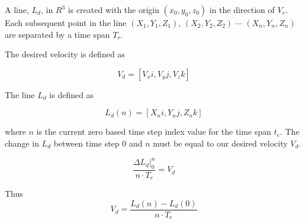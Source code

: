 A line, $L_d$, in $R^3$ is created with the origin $(x_0, y_0, z_0)$ in the direction of $V_e$.  Each subsequent point in the line $(X_1, Y_1, Z_1)$, $(X_2, Y_2, Z_2)$ $\cdots$ $(X_n, Y_n, Z_n)$ are separated by a time span $T_r$.

The desired velocity is defined as

\begin{equation}
V_d = [V_xi, V_yj, V_zk]
\end{equation}




The line $L_d$ is defined as

\begin{equation}
L_d(n) = [X_ni, Y_nj , Z_nk]
\end{equation}

where $n$ is the current zero based time step index value for the time span $t_e$.  The change in $L_d$ between time step $0$ and $n$ must be equal to our desired velocity $V_d$.


\begin{equation}
\frac{\Delta L_d|_{0}^{n}}{n \cdot T_r} = V_d
\end{equation}



Thus
\begin{equation}
V_d = \frac{L_d(n) - L_d(0)}{n \cdot T_r}
\end{equation}


